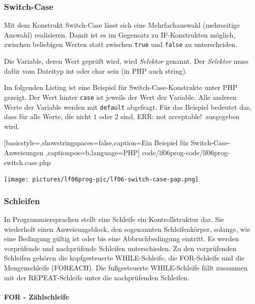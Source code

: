 \subsubsection{Switch-Case}

Mit dem Konstrukt Switch-Case lässt sich eine Mehrfachauswahl (mehrseitige Auswahl) realisieren. Damit ist es im Gegensatz zu IF-Konstrukten möglich, zwischen beliebigen Werten statt zwischen \texttt{true} und \texttt{false} zu unterscheiden.

Die Variable, deren Wert geprüft wird, wird {\it Selektor} genannt. Der {\it Selektor} muss dafür vom Dateityp int oder char sein (in PHP auch string).

Im folgenden Listing ist eine Beispiel für Switch-Case-Konstrukte unter PHP gezeigt. Der Wert hinter \texttt{case} ist jeweils der Wert der Variable. Alle anderen Werte der Variable werden mit \texttt{default} abgefragt. Für das Beispiel bedeutet das, dass für alle Werte, die nicht $1$ oder $2$ sind, \ql ERR: not acceptable!\qr\ ausgegeben wird.


	[basicstyle=\small,showstringspaces=false,caption={Ein Beispiel für Switch-Case-Anweisungen}
	\label{lst:Switch-Case},captionpos=b,language=PHP]
	{code/lf06prog-code/lf06prog-switch.case.php}
	
\texttt{[image: pictures/lf06prog-pic/lf06-switch-case-pap.png]}

\subsubsection{Schleifen}

In Programmiersprachen stellt eine Schleife ein Kontrollstruktur dar. Sie wiederholt einen Anweisungsblock, den sogenannten Schleifenkörper, solange, wie eine Bedingung gültig ist oder bis eine Abbruchbedingung eintritt. Es werden vorprüfende und nachprüfende Schleifen unterschieden. Zu den vorprüfenden Schleifen gehören die kopfgesteuerte WHILE-Schleife, die FOR-Schleife und die Mengenschleife (FOREACH). Die fußgesteuerte WHILE-Schleife fällt zusammen mit der REPEAT-Schleife unter die nachprüfenden Schleifen.

\paragraph{FOR - Zählschleife}~\\

